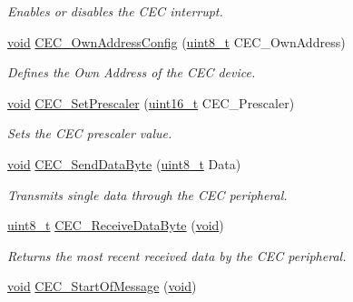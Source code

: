 \begin{DoxyCompactItemize}
\begin{DoxyCompactList}\small\item\em Enables or disables the C\+EC interrupt. \end{DoxyCompactList}\item 
\hyperlink{usb__devapi_8h_afabf60e7f57651d6d595a02c75f07cd0}{void} \hyperlink{group___c_e_c___private___functions_gacad422ef1f50246b2021b41835b8a95c}{C\+E\+C\+\_\+\+Own\+Address\+Config} (\hyperlink{_p_e___types_8h_aba7bc1797add20fe3efdf37ced1182c5}{uint8\+\_\+t} C\+E\+C\+\_\+\+Own\+Address)
\begin{DoxyCompactList}\small\item\em Defines the Own Address of the C\+EC device. \end{DoxyCompactList}\item 
\hyperlink{usb__devapi_8h_afabf60e7f57651d6d595a02c75f07cd0}{void} \hyperlink{group___c_e_c___private___functions_gad2fc626e28a82008a29f062975a9af11}{C\+E\+C\+\_\+\+Set\+Prescaler} (\hyperlink{_p_e___types_8h_a1f1825b69244eb3ad2c7165ddc99c956}{uint16\+\_\+t} C\+E\+C\+\_\+\+Prescaler)
\begin{DoxyCompactList}\small\item\em Sets the C\+EC prescaler value. \end{DoxyCompactList}\item 
\hyperlink{usb__devapi_8h_afabf60e7f57651d6d595a02c75f07cd0}{void} \hyperlink{group___c_e_c___private___functions_ga6897ab26d8f909f9160e9fac54b97441}{C\+E\+C\+\_\+\+Send\+Data\+Byte} (\hyperlink{_p_e___types_8h_aba7bc1797add20fe3efdf37ced1182c5}{uint8\+\_\+t} Data)
\begin{DoxyCompactList}\small\item\em Transmits single data through the C\+EC peripheral. \end{DoxyCompactList}\item 
\hyperlink{_p_e___types_8h_aba7bc1797add20fe3efdf37ced1182c5}{uint8\+\_\+t} \hyperlink{group___c_e_c___private___functions_ga165837bff6292e7674eff6f8b230da97}{C\+E\+C\+\_\+\+Receive\+Data\+Byte} (\hyperlink{usb__devapi_8h_afabf60e7f57651d6d595a02c75f07cd0}{void})
\begin{DoxyCompactList}\small\item\em Returns the most recent received data by the C\+EC peripheral. \end{DoxyCompactList}\item 
\hyperlink{usb__devapi_8h_afabf60e7f57651d6d595a02c75f07cd0}{void} \hyperlink{group___c_e_c___private___functions_ga71e700461ffe7820d9e1c75da65fd0fb}{C\+E\+C\+\_\+\+Start\+Of\+Message} (\hyperlink{usb__devapi_8h_afabf60e7f57651d6d595a02c75f07cd0}{void})

\end{DoxyCompactItemize}

